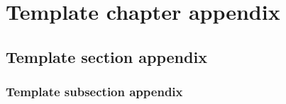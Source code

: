 \chapter{Template chapter appendix}
\section{Template section appendix}
\subsection{Template subsection appendix}
\lipsum[1-2]